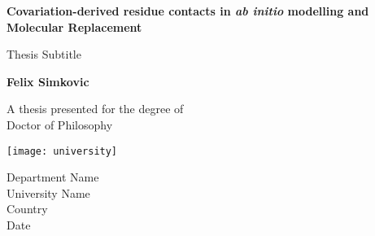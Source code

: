 \begin{titlepage}
    \begin{center}
        \vspace*{1cm}
        
        \Huge
        \textbf{Covariation-derived residue contacts in \textit{ab initio} modelling and Molecular Replacement}
        
        \vspace{0.5cm}
        \LARGE
        Thesis Subtitle
        
        \vspace{1.5cm}
        
        \textbf{Felix Simkovic}
        
        \vfill
        
        A thesis presented for the degree of\\
        Doctor of Philosophy
        
        \vspace{0.8cm}
        
        \texttt{[image: university]}
        
        \Large
        Department Name\\
        University Name\\
        Country\\
        Date
        
    \end{center}
\end{titlepage}
